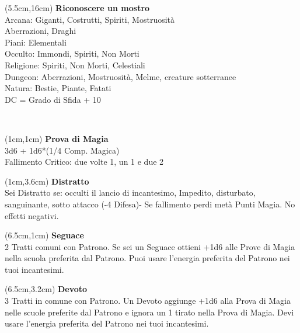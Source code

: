 \documentclass[a4paper,12 pt,openany]{book}
\begin{document}
\begin{textblock*}{7cm}(5.5cm,16cm) %
	\textbf{Riconoscere un mostro}\\
	Arcana: Giganti, Costrutti, Spiriti, Mostruosità\\
	Aberrazioni, Draghi\\
	Piani: Elementali\\
	Occulto: Immondi, Spiriti, Non Morti\\
	Religione: Spiriti, Non Morti, Celestiali\\
	Dungeon: Aberrazioni, Mostruosità, Melme, creature sotterranee\\
	Natura: Bestie, Piante, Fatati\\
	DC = Grado di Sfida + 10
\end{textblock*}


	~\newpage

\begin{textblock*}{5cm}(1cm,1cm) %
		\textbf{Prova di Magia}\\
3d6 + 1d6*(1/4 Comp. Magica)\\
Fallimento Critico: due volte 1, un 1 e due 2\\
	\end{textblock*}

\begin{textblock*}{5cm}(1cm,3.6cm) %
	\textbf{Distratto}\\
Sei Distratto se: occulti il lancio di incantesimo, Impedito, disturbato, sanguinante, sotto attacco (-4 Difesa)-
Se fallimento perdi metà Punti Magia. No effetti negativi.\\
\end{textblock*}

\begin{textblock*}{13.5cm}(6.5cm,1cm) %
	\textbf{Seguace}\\
2 Tratti comuni con Patrono. Se sei un Seguace ottieni +1d6 alle Prove di Magia nella scuola preferita dal Patrono. Puoi usare l'energia preferita del Patrono nei tuoi incantesimi.\\
\end{textblock*}

\begin{textblock*}{13.5cm}(6.5cm,3.2cm) %
	\textbf{Devoto}\\
3 Tratti in comune con Patrono. Un Devoto aggiunge +1d6 alla Prova di Magia nelle scuole preferite dal Patrono e ignora un 1 tirato nella Prova di Magia. Devi usare l'energia preferita del Patrono nei tuoi incantesimi.
\end{textblock*}
\end{document}
